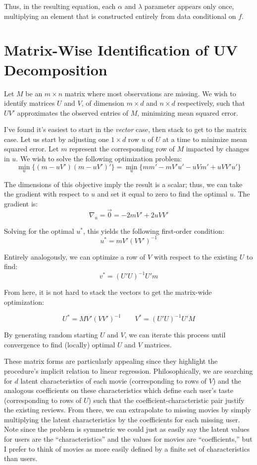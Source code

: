 \documentclass{article}
\begin{document}
\begin{appendices}
Thus, in the resulting equation, each $\alpha$ and $\lambda$ parameter appears only once, multiplying an element that is constructed entirely from data conditional on $f$. 

\section{Matrix-Wise Identification of UV Decomposition}
\label{app:uv}

Let $M$ be an $m \times n$ matrix where most observations are missing. We wish to identify matrices $U$ and $V$, of dimension $m \times d$ and $n \times d$ respectively, such that $UV'$ approximates the observed entries of $M$, minimizing mean squared error. 

I've found it's easiest to start in the \emph{vector} case, then stack to get to the matrix case. Let us start by adjusting one $1 \times d$ row $u$ of $U$ at a time to minimize mean squared error. Let $m$ represent the corresponding row of $M$ impacted by changes in $u$. We wish to solve the following optimization problem:
$$\min_{u} \{ (m - uV')(m - uV')' \} = \min_{u} \{mm' - mV'u' - uVm' + uVV'u' \} $$

The dimensions of this objective imply the result is a scalar; thus, we can take the gradient with respect to $u$ and set it equal to zero to find the optimal $u$. The gradient is:
$$\nabla_u = \vec{0} = -2mV' + 2uVV'$$

Solving for the optimal $u^*$, this yields the following first-order condition:
$$u^* = mV'(VV')^{-1}$$

Entirely analogously, we can optimize a row of $V$ with respect to the existing $U$ to find:
$$v^* = (U'U)^{-1}U'm$$

From here, it is not hard to stack the vectors to get the matrix-wide optimization:

$$U^* = MV'(VV')^{-1} \qquad V^* = (U'U)^{-1}U'M$$

By generating random starting $U$ and $V$, we can iterate this process until convergence to find (locally) optimal $U$ and $V$ matrices.

These matrix forms are particularly appealing since they highlight the procedure's implicit relation to linear regression. Philosophically, we are searching for $d$ latent characteristics of each movie (corresponding to rows of $V$) and the analogous coefficients on these characteristics which define each user's taste (corresponding to rows of $U$) such that the coefficient-characteristic pair justify the existing reviews. From there, we can extrapolate to missing movies by simply multiplying the latent characteristics by the coefficients for each missing user. Note since the problem is symmetric we could just as easily say the latent values for users are the ``characteristics'' and the values for movies are ``coefficients,'' but I prefer to think of movies as more easily defined by a finite set of characteristics than users.

\end{appendices}
\end{document}
